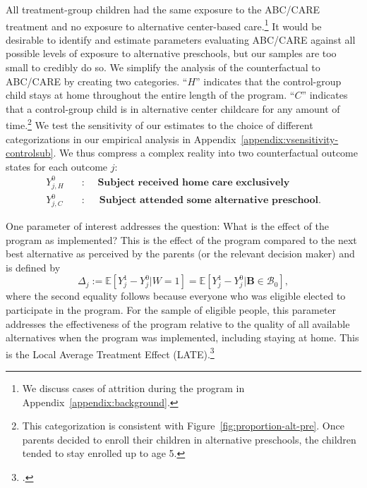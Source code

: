 All treatment-group children had the same exposure to the ABC/CARE treatment and no exposure to alternative center-based care.\footnote{We discuss cases of attrition during the program in Appendix~\ref{appendix:background}.} It would be desirable to identify and estimate parameters evaluating ABC/CARE against all possible levels of exposure to alternative preschools, but our samples are too small to credibly do so. We simplify the analysis of the counterfactual to ABC/CARE by creating two categories. ``$H$'' indicates that the control-group child stays at home throughout the entire length of the program. ``$C$'' indicates that a control-group child is in alternative center childcare for any amount of time.\footnote{This categorization is consistent with Figure~\ref{fig:proportion-alt-pre}. Once parents decided to enroll their children in alternative preschools, the children tended to stay enrolled up to age 5.} We test the sensitivity of our estimates to the choice of different categorizations in our empirical analysis in Appendix~\ref{appendix:vsensitivity-controlsub}. We thus compress a complex reality into two counterfactual outcome states for each outcome $j$:
\begin{align*}
Y_{j,H}^0 \quad &: \quad \textbf{ Subject received home care exclusively} \\
Y_{j,C}^0 \quad &: \quad \textbf{ Subject attended some alternative preschool}.
\end{align*}


One parameter of interest addresses the question: What is the effect of the program as implemented? This is the effect of the program compared to the next best alternative as perceived by the parents (or the relevant decision maker) and is defined by
\begin{equation}\label{eq:effect}
\Delta_j := \mathbb{E} \left[ Y_{j}^1 -  Y_{j}^0 | W =1 \right] = \mathbb{E} \left[Y_{j}^1 -  Y_{j}^0 | \bm{B} \in \mathcal{B}_0 \right],
\end{equation}
where the second equality follows because everyone who was eligible elected to participate in the program. For the sample of eligible people, this parameter addresses the effectiveness of the program relative to the quality of all available alternatives when the program was implemented, including staying at home. This is the Local Average Treatment Effect (LATE).\footnote{\citet{Imbens_Angrist_1994_Econometrica}.}

